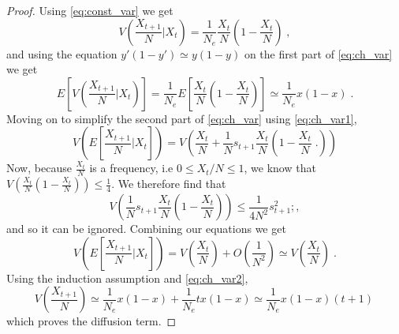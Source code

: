 \documentclass[12pt]{extarticle}
\begin{document}
\begin{appendices}
\begin{proof}
Using \cref{eq:const_var} we get
\begin{equation}
V\left(\frac{X_{t+1}}{N} \bigg|X_t \right) 
= \frac{1}{N_e}\frac{X_t}{N}\left(1-\frac{X_t}{N} \right) \;,
\end{equation}
and using the equation $y'(1-y') \simeq y(1-y)$ on the first part of \cref{eq:ch_var} we get
\begin{equation}\label{eq:ch_var2}
E\left[V\left(\frac{X_{t+1}}{N} \bigg|X_t \right)\right] 
= \frac{1}{N_e}E\left[\frac{X_t}{N}\left(1- \frac{X_t}{N}\right) \right] \simeq \frac{1}{N_e} x(1-x) \;.
\end{equation}
Moving on to simplify the second part of \cref{eq:ch_var} using \cref{eq:ch_var1},
\begin{equation}
V\left(E\left[\frac{X_{t+1}}{N} \bigg|X_t \right]\right) 
= V\left(\frac{X_t}{N} + \frac{1}{N}s_{t+1}\frac{X_t}{N}\left(1-\frac{X_t}{N} \;.\right) \right)
\end{equation}
Now, because $\frac{X_t}{N}$ is a frequency, i.e $0 \leq X_t/N \leq 1$, we know that $V\left(\frac{X_t}{N}\left(1-\frac{X_t}{N} \right) \right)\leq\frac{1}{4}$. We therefore find that
\begin{equation}
V\left(\frac{1}{N}s_{t+1}\frac{X_t}{N}\left(1-\frac{X_t}{N} \right) \right)
\leq \frac{1}{4N^2}s^2_{t+1} ;,
\end{equation}
and so it can be ignored.
Combining our equations we get
\begin{equation}
V\left(E\left[\frac{X_{t+1}}{N} \bigg|X_t \right]\right) 
= V\left(\frac{X_t}{N}\right) + O\left(\frac{1}{N^2}\right)\simeq V\left(\frac{X_t}{N}\right) \;.
\end{equation}
Using the induction assumption and \cref{eq:ch_var2},
\begin{equation}
V\left(\frac{X_{t+1}}{N}\right) 
\simeq \frac{1}{N_e}x(1-x) + \frac{1}{N_e}tx(1-x) \simeq \frac{1}{N_e}x(1-x)(t+1) \,
\end{equation}
which proves the diffusion term.
\end{proof}
\end{appendices}

\end{document}
